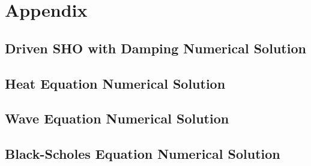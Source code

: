 \appendix
\section{Appendix}
\label{section:appendix}

\subsection{Driven SHO with Damping Numerical Solution}
\label{code:driven_sho}

\subsection{Heat Equation Numerical Solution}
\label{code:heat_equation}

\subsection{Wave Equation Numerical Solution}
\label{code:wave_equation}

\subsection{Black-Scholes Equation Numerical Solution}
\label{code:black_scholes_equation}
